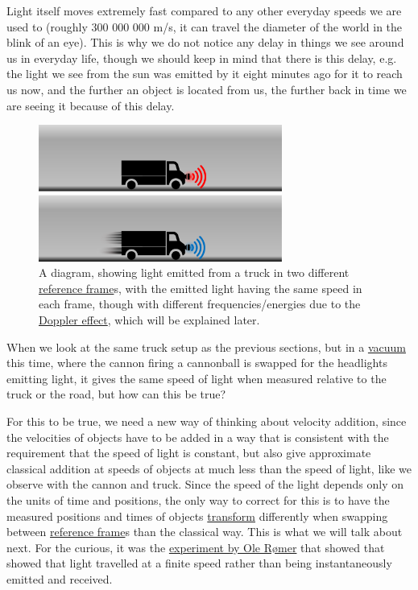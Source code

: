 Light itself moves extremely fast compared to any other everyday speeds we are used to (roughly 300 000 000 m/s, it can travel the diameter of the world in the blink of an eye). This is why we do not notice any delay in things we see around us in everyday life, though we should keep in mind that there is this delay, e.g. the light we see from the sun was emitted by it eight minutes ago for it to reach us now, and the further an object is located from us, the further back in time we are seeing it because of this delay.

\begin{figure}[ht]
	\centering
	\includegraphics[width=8cm]{images/pdf/lorry_torch.pdf}
	\caption{A diagram, showing light emitted from a truck in two different \protect\hyperlink{def-Reference-frame}{reference frame}s, with the emitted light having the same speed in each frame, though with different frequencies/energies due to the \protect\hyperlink{def-doppler-effect}{Doppler effect}, which will be explained later.}
	\label{fig: truck torch}
\end{figure}


When we look at the same truck setup as the previous sections, but in a \hyperlink{def-vacuum}{vacuum} this time, where the cannon firing a cannonball is swapped for the headlights emitting light, it gives the same speed of light when measured relative to the truck or the road, but how can this be true?

For this to be true, we need a new way of thinking about velocity addition, since the velocities of objects have to be added in a way that is consistent with the requirement that the speed of light is constant, but also give approximate classical addition at speeds of objects at much less than the speed of light, like we observe with the cannon and truck. Since the speed of the light depends only on the units of time and positions, the only way to correct for this is to have the measured positions and times of objects \hyperlink{def-transform}{transform} differently when swapping between \hyperlink{def-Reference-frame}{reference frame}s than the classical way. This is what we will talk about next.
For the curious, it was the \href{https://scienceready.com.au/pages/determination-of-speed-of-light}{experiment by Ole Rømer} that showed that showed that light travelled at a finite speed rather than being instantaneously emitted and received.


